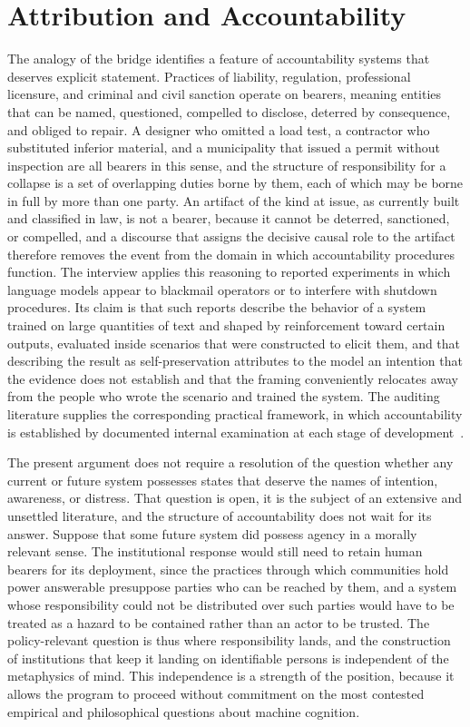 \chapter{Attribution and Accountability}
\label{ch:02}

The analogy of the bridge identifies a feature of accountability systems that deserves explicit statement. Practices of liability, regulation, professional licensure, and criminal and civil sanction operate on bearers, meaning entities that can be named, questioned, compelled to disclose, deterred by consequence, and obliged to repair. A designer who omitted a load test, a contractor who substituted inferior material, and a municipality that issued a permit without inspection are all bearers in this sense, and the structure of responsibility for a collapse is a set of overlapping duties borne by them, each of which may be borne in full by more than one party. An artifact of the kind at issue, as currently built and classified in law, is not a bearer, because it cannot be deterred, sanctioned, or compelled, and a discourse that assigns the decisive causal role to the artifact therefore removes the event from the domain in which accountability procedures function. The interview applies this reasoning to reported experiments in which language models appear to blackmail operators or to interfere with shutdown procedures. Its claim is that such reports describe the behavior of a system trained on large quantities of text and shaped by reinforcement toward certain outputs, evaluated inside scenarios that were constructed to elicit them, and that describing the result as self-preservation attributes to the model an intention that the evidence does not establish and that the framing conveniently relocates away from the people who wrote the scenario and trained the system. The auditing literature supplies the corresponding practical framework, in which accountability is established by documented internal examination at each stage of development~\cite{raji2020}.

The present argument does not require a resolution of the question whether any current or future system possesses states that deserve the names of intention, awareness, or distress. That question is open, it is the subject of an extensive and unsettled literature, and the structure of accountability does not wait for its answer. Suppose that some future system did possess agency in a morally relevant sense. The institutional response would still need to retain human bearers for its deployment, since the practices through which communities hold power answerable presuppose parties who can be reached by them, and a system whose responsibility could not be distributed over such parties would have to be treated as a hazard to be contained rather than an actor to be trusted. The policy-relevant question is thus where responsibility lands, and the construction of institutions that keep it landing on identifiable persons is independent of the metaphysics of mind. This independence is a strength of the position, because it allows the program to proceed without commitment on the most contested empirical and philosophical questions about machine cognition.

